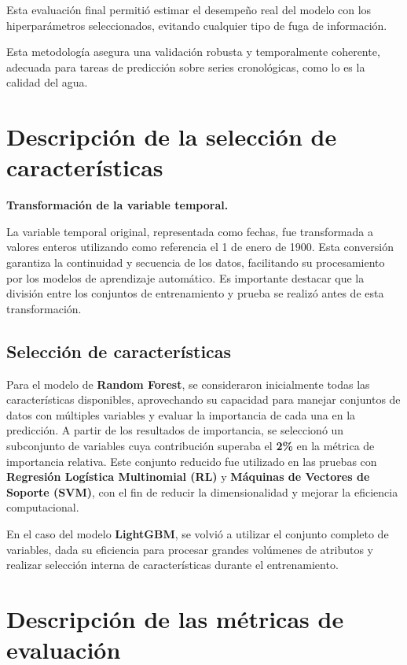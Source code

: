 \documentclass[
  11pt,
  pdftitle=TFI - Tschopp Joaquín S.,
  pdfauthor=Tschopp Joaquín S.,
  pdfcreator=LaTeX with hyperref,
]{report}  %
\begin{document}
Esta evaluación final permitió estimar el desempeño real del modelo con los hiperparámetros seleccionados, evitando cualquier tipo de fuga de información.

Esta metodología asegura una validación robusta y temporalmente coherente, adecuada para tareas de predicción sobre series cronológicas, como lo es la calidad del agua.\citep{brownlee2018walkforward}

\section{Descripción de la selección de características}

\textbf{Transformación de la variable temporal.}

La variable temporal original, representada como fechas, fue transformada a valores enteros utilizando como referencia el 1 de enero de 1900. Esta conversión garantiza la continuidad y secuencia de los datos, facilitando su procesamiento por los modelos de aprendizaje automático. Es importante destacar que la división entre los conjuntos de entrenamiento y prueba se realizó antes de esta transformación.


\subsection{Selección de características}

Para el modelo de \textbf{Random Forest}, se consideraron inicialmente todas las características disponibles, aprovechando su capacidad para manejar conjuntos de datos con múltiples variables y evaluar la importancia de cada una en la predicción. A partir de los resultados de importancia, se seleccionó un subconjunto de variables cuya contribución superaba el \textbf{2\%} en la métrica de importancia relativa. Este conjunto reducido fue utilizado en las pruebas con \textbf{Regresión Logística Multinomial (RL)} y \textbf{Máquinas de Vectores de Soporte (SVM)}, con el fin de reducir la dimensionalidad y mejorar la eficiencia computacional.

En el caso del modelo \textbf{LightGBM}, se volvió a utilizar el conjunto completo de variables, dada su eficiencia para procesar grandes volúmenes de atributos y realizar selección interna de características durante el entrenamiento.


\section{Descripción de las métricas de evaluación}
\end{document}

